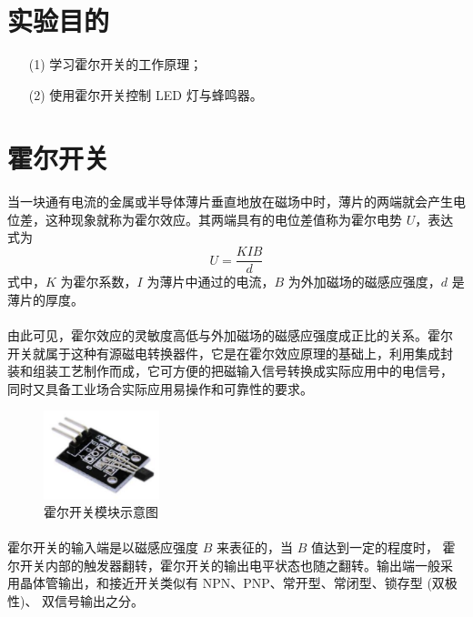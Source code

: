 \documentclass[UTF8, oneside]{ctexbook}
\begin{document}
\section{实验目的}
\begin{itemize}
    \item[(1)] 学习霍尔开关的工作原理；
    \item[(2)] 使用霍尔开关控制 LED 灯与蜂鸣器。
\end{itemize}

\section{霍尔开关}
\paragraph{}
当一块通有电流的金属或半导体薄片垂直地放在磁场中时，薄片的两端就会产生电
位差，这种现象就称为霍尔效应。其两端具有的电位差值称为霍尔电势 $U$，表达式为
\begin{equation*}
    U = \frac{KIB}{d}
\end{equation*}
式中，$K$ 为霍尔系数，$I$ 为薄片中通过的电流，$B$ 为外加磁场的磁感应强度，$d$ 是薄片的厚度。

\paragraph{}
由此可见，霍尔效应的灵敏度高低与外加磁场的磁感应强度成正比的关系。霍尔
开关就属于这种有源磁电转换器件，它是在霍尔效应原理的基础上，利用集成封
装和组装工艺制作而成，它可方便的把磁输入信号转换成实际应用中的电信号，
同时又具备工业场合实际应用易操作和可靠性的要求。

\begin{figure}[h]
    \centering
    \includegraphics[width=0.3\textwidth]{./result/sensor/18/sensor.png}
    \caption{霍尔开关模块示意图}
    \label{18_sensor}
\end{figure}

\paragraph{}
霍尔开关的输入端是以磁感应强度 $B$ 来表征的，当 $B$ 值达到一定的程度时，
霍尔开关内部的触发器翻转，霍尔开关的输出电平状态也随之翻转。输出端一般采
用晶体管输出，和接近开关类似有 NPN、PNP、常开型、常闭型、锁存型 (双极性)、
双信号输出之分。
\end{document}
